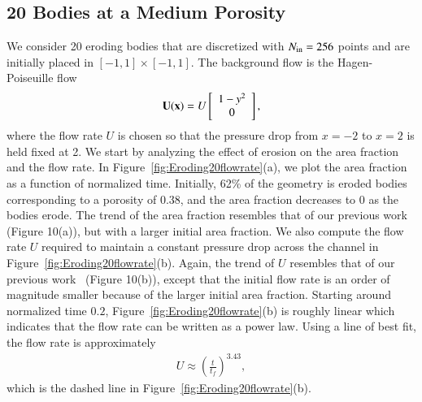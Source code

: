\documentclass[preprint, 10pt]{elsarticle}
\begin{document}
\subsection{20 Bodies at a Medium Porosity}
We consider 20 eroding bodies that are discretized with $N_{\mathrm{in}}=256$
points and are initially placed in $[-1,1] \times [-1,1]$.  The
background flow is the Hagen-Poiseuille flow
\begin{align}
  {\mathbf{U}}({\mathbf{x}})=U \left[
  \begin{array}{c}
    1-y^2 \\ 0
  \end{array}
  \right],
\end{align}
where the flow rate $U$ is chosen so that the pressure drop from $x=-2$
to $x=2$ is held fixed at 2.  We start by analyzing the effect of
erosion on the area fraction and the flow rate.  In
Figure~\ref{fig:Eroding20flowrate}(a), we plot the area fraction as a
function of normalized time.  Initially, 62\% of the geometry is eroded
bodies corresponding to a porosity of $0.38$, and the area fraction
decreases to 0 as the bodies erode.  The trend of the area fraction
resembles that of our previous work~\cite{qua-moo2018} (Figure 10(a)),
but with a larger initial area fraction.  We also compute the flow rate
$U$ required to maintain a constant pressure drop across the channel in
Figure~\ref{fig:Eroding20flowrate}(b).  Again, the trend of $U$
resembles that of our previous work~\cite{qua-moo2018} (Figure 10(b)),
except that the initial flow rate is an order of magnitude smaller
because of the larger initial area fraction.  Starting around normalized
time $0.2$, Figure~\ref{fig:Eroding20flowrate}(b) is roughly linear
which indicates that the flow rate can be written as a power law.  Using
a line of best fit, the flow rate is approximately 
\begin{align} 
  U \approx \left(\frac{t}{t_f}\right)^{3.43},
\end{align}
which is the dashed line in Figure~\ref{fig:Eroding20flowrate}(b).
\end{document}
